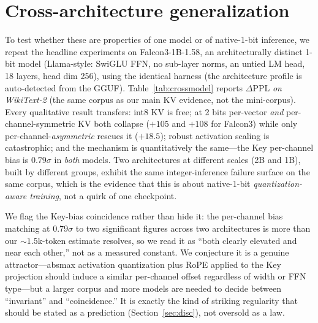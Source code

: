 \documentclass[11pt]{article}
\begin{document}
\section{Cross-architecture generalization}
\label{sec:cross}
To test whether these are properties of one model or of native-1-bit inference,
we repeat the headline experiments on Falcon3-1B-1.58, an architecturally distinct
1-bit model (Llama-style: SwiGLU FFN, no sub-layer norms, an untied LM head, 18
layers, head dim 256), using the identical harness (the architecture profile is
auto-detected from the GGUF). Table~\ref{tab:crossmodel} reports $\Delta$PPL
\emph{on WikiText-2} (the same corpus as our main KV evidence, not the mini-corpus).
Every qualitative result transfers: int8 KV is free; at 2 bits per-vector \emph{and}
per-channel-symmetric KV both collapse ($+105$ and $+108$ for Falcon3) while only
per-channel-\emph{asymmetric} rescues it ($+18.5$); robust activation scaling is
catastrophic; and the mechanism is quantitatively the same---the Key per-channel bias
is $0.79\sigma$ in \emph{both} models. Two architectures at different scales (2B and
1B), built by different groups, exhibit the same integer-inference failure surface on
the same corpus, which is the evidence that this is about native-1-bit
\emph{quantization-aware training}, not a quirk of one checkpoint.

We flag the Key-bias coincidence rather than hide it: the per-channel bias matching
at $0.79\sigma$ to two significant figures across two architectures is more than our
$\sim\!1.5$k-token estimate resolves, so we read it as ``both clearly elevated and
near each other,'' not as a measured constant. We conjecture it is a genuine
attractor---absmax activation quantization plus RoPE applied to the Key projection
should induce a similar per-channel offset regardless of width or FFN type---but a
larger corpus and more models are needed to decide between ``invariant'' and
``coincidence.'' It is exactly the kind of striking regularity that should be stated
as a prediction (Section~\ref{sec:disc}), not oversold as a law.


\end{document}
